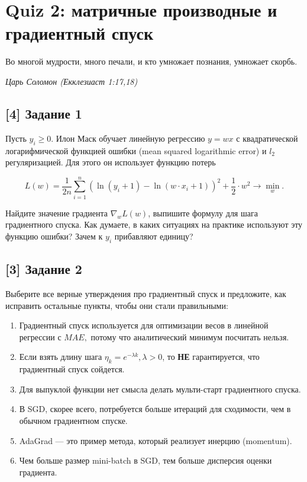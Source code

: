 \documentclass[12pt, a4paper, oneside]{article}
\begin{document}
\section*{Quiz 2: матричные производные и градиентный спуск}

\epigraph{Во многой мудрости, много печали, и кто умножает познания, умножает скорбь.}{\textit{Царь Соломон (Екклезиаст 1:17,18)}}

\vspace{-0.5cm}
\subsection*{[4] Задание 1}
\vspace{-0.5cm}

Пусть $y_i \ge 0$. Илон Маск обучает линейную регрессию  $y = w x$ с квадратической логарифмической функцией ошибки (mean squared logarithmic error) и $l_2$ регуляризацией. Для этого он использует функцию потерь 

\[
L(w) = \frac{1}{2n} \sum_{i=1}^n (\ln(y_i + 1) - \ln(w \cdot x_i + 1))^2 +  \frac{1}{2} \cdot w^2 \to \min_{w}.
\]

Найдите значение градиента $\nabla_w L(w)$, выпишите формулу для шага градиентного спуска. Как думаете, в каких ситуациях на практике используют эту функцию ошибки? Зачем к $y_i$ прибавляют единицу? 

\vspace{-0.5cm}
\subsection*{[3] Задание 2}
\vspace{-0.5cm}
Выберите все верные утверждения про градиентный спуск и предложите, как исправить остальные пункты, чтобы они стали правильными:
\begin{enumerate}
    \item Градиентный спуск используется для оптимизации весов в линейной регрессии с $MAE,$ потому что аналитический минимум посчитать нельзя.
    \item Если взять длину шага $\eta_k = e^{-\lambda k}, \lambda > 0$, то \textbf{НЕ} гарантируется, что градиентный спуск сойдется.
    \item Для выпуклой функции нет смысла делать мульти-старт градиентного спуска.
    \item В SGD, скорее всего, потребуется больше итераций для сходимости, чем в обычном градиентном спуске.
    \item AdaGrad — это пример метода, который реализует инерцию (momentum).
    \item Чем больше размер mini-batch в SGD, тем больше дисперсия оценки градиента.
\end{enumerate}
\end{document}
